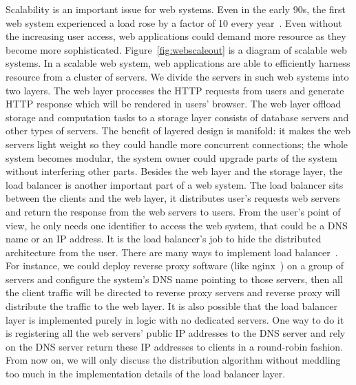 Scalability is an important issue for web systems.
Even in the early 90s, the first web system experienced a load rose by a factor
of 10 every year~\cite{berners1998world}.
Even without the increasing user access,
web applications could demand more resource as they become more sophisticated.
Figure~\ref{fig:webscaleout} is a diagram of scalable web systems.
In a scalable web system, web applications are able to efficiently 
harness resource from a cluster of servers.
We divide the servers in such web systems into two layers.
The web layer processes the HTTP requests from users
and generate HTTP response which will be rendered in users' browser.
The web layer offload storage and computation tasks to a storage layer
consists of database servers and other types of servers.
The benefit of layered design is manifold:
it makes the web servers light weight so they could handle more concurrent 
connections;
the whole system becomes modular,
the system owner could upgrade parts of the system without interfering
other parts.
Besides the web layer and the storage layer,
the load balancer is another important part of a web system.
The load balancer sits between the clients and the web layer,
it  distributes user's requests web servers
and return the response from the web servers to users.
From the user's point of view, 
he only needs one identifier to
access the web system, that could be a DNS~\cite{rfc1034} name or an IP address.
It is the load balancer's job to hide 
the distributed architecture
 from the user.
There are many ways to implement load balancer~\cite{cardellini2002state}.
For instance, 
we could
deploy reverse proxy software (like nginx~\cite{nginx})
on a group of servers
and configure the system's DNS name pointing to those servers,
then all the client traffic will be directed to reverse proxy servers
and reverse proxy will distribute the traffic to the web layer.
It is also possible that the load balancer layer is implemented purely in logic 
with no dedicated servers.
One way to do it is
 registering all the web servers' public IP addresses to the DNS server
and rely on the DNS server return these IP addresses to clients in a round-robin
fashion.
From now on, we will only discuss the distribution algorithm without meddling too much
in the implementation details of the load balancer layer.


